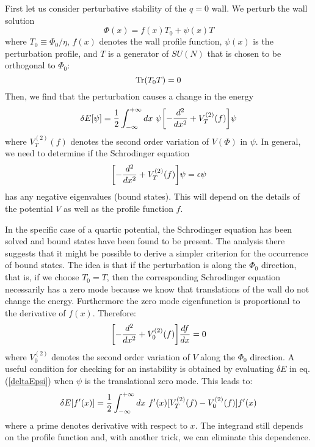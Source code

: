 \documentclass[a4paper,prd,nofootinbib,twocolumn,showpacs]{revtex4}
\begin{document}
{}First let us consider perturbative stability of the $q=0$
wall. We perturb the wall solution
\begin{equation}
\Phi (x) = f(x) T_0 + \psi (x) T
\label{perturbedkink}
\end{equation}
where $T_0 \equiv \Phi_0/\eta$, $f(x)$ denotes the wall profile 
function, $\psi (x)$ is the perturbation profile, and $T$ is a 
generator of $SU(N)$ that is chosen to be orthogonal to $\Phi_0$:
\begin{equation}
{\rm Tr} (T_0 T) = 0
\label{trT0t}
\end{equation}
Then, we find that the perturbation causes a change in
the energy
\begin{equation}
\delta E [\psi ] = {{1} \over 2} \int_{-\infty}^{+\infty} dx ~
  \psi \biggl [ - {{d^2}\over {dx^2}} + V_T^{(2)} (f) \biggr ] \psi
\label{deltaEpsi}
\end{equation}
where $V_T^{(2)} (f)$ denotes the second order variation of 
$V(\Phi )$ in $\psi$. In general, we need to determine if the 
Schrodinger equation 
\begin{equation}
 \biggl [ - {{d^2}\over {dx^2}} + V_T^{(2)} (f) \biggr ] \psi = 
                  \epsilon \psi
\label{schrodinger}
\end{equation}
has any negative eigenvalues (bound states). This will depend on
the details of the potential $V$ as well as the profile function
$f$.

In the specific case of a quartic potential, the Schrodinger 
equation has been solved \cite{PogVac00b,PogVac01} 
and bound states have been found to be present. The analysis
there suggests that it might be possible to derive a simpler
criterion for the occurrence of bound states. The idea is that
if the perturbation is along the $\Phi_0$ direction, that is,
if we choose $T_0 = T$, then the corresponding Schrodinger equation
necessarily has a zero mode because we know that translations 
of the wall do not change the energy. Furthermore the zero
mode eigenfunction is proportional to the derivative of $f(x)$. 
Therefore:
\begin{equation}
 \biggl [ - {{d^2}\over {dx^2}} + V_0^{(2)} (f) \biggr ] 
           {{df}\over {dx}} = 0
\label{schrodinger0}
\end{equation}
where $V_0^{(2)}$ denotes the second order variation of
$V$ along the $\Phi_0$ direction. A useful condition for
checking for an instability is obtained by evaluating 
$\delta E$ in eq. (\ref{deltaEpsi}) when $\psi$ is the translational 
zero mode. This leads to:
\begin{equation}
\delta E [ f'(x) ] = 
 {1\over 2} \int_{-\infty}^{+\infty} dx ~ f'(x) 
                   [ V_T^{(2)} (f) - V_0^{(2)} (f) ] f'(x)
\label{deltaEfprime}
\end{equation}
where a prime denotes derivative with respect to $x$. The
integrand still depends on the profile function and, with
another trick, we can eliminate this dependence.
\end{document}
